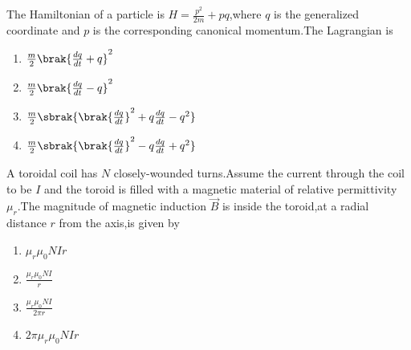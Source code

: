      \item The Hamiltonian of a particle is $H=\frac{p^2}{2m}+pq$,where $q$ is the generalized coordinate and $p$ is the corresponding canonical momentum.The Lagrangian is
     \begin{enumerate}
         \item $\frac{m}{2}\brak{\frac{dq}{dt}+q}^2$
         \item $\frac{m}{2}\brak{\frac{dq}{dt}-q}^2$
         \item $\frac{m}{2}\sbrak{\brak{\frac{dq}{dt}}^2+q\frac{dq}{dt}-q^2}$
         \item $\frac{m}{2}\sbrak{\brak{\frac{dq}{dt}}^2-q\frac{dq}{dt}+q^2}$
     \end{enumerate}
     \item A toroidal coil has $N$ closely-wounded turns.Assume the current through the coil to be $I$ and the toroid is filled with a magnetic material of relative permittivity $\mu_{r}$.The magnitude of magnetic induction $\Vec{B}$ is inside the toroid,at a radial distance $r$ from the axis,is given by
     \begin{enumerate}
         \item $\mu_{r}\mu_{0}NIr$
         \item $\frac{\mu_{r}\mu_{0}NI}{r}$
         \item $\frac{\mu_{r}\mu_{0}NI}{2\pi r}$
         \item $2\pi\mu_{r}\mu_{0}NIr$
     \end{enumerate}

    


